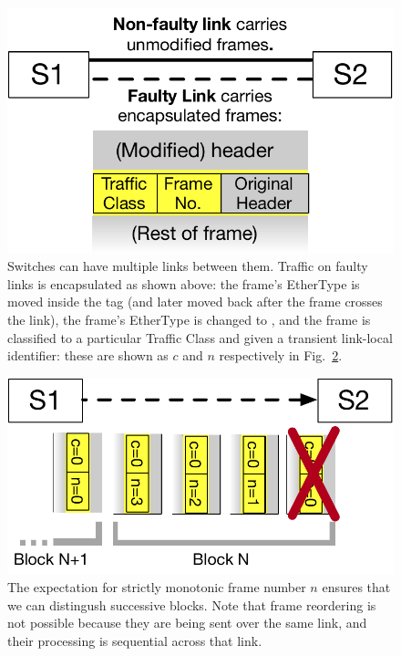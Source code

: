 \begin{figure}
  \centering
  \includegraphics[width=0.3\paperwidth]{header_format.pdf}
  \caption{\label{fig:format}Switches can have multiple links between them.
  Traffic on faulty links is encapsulated as shown above: the frame's EtherType
  is moved inside the \OurSys tag (and later moved back after the frame crosses
  the link), the frame's EtherType is changed to \OurSys, and the frame is
  classified to a particular Traffic Class and given a transient link-local
  identifier: these are shown as $c$ and $n$ respectively in
  Fig.~\ref{fig:example-loss}.}
\end{figure}

\begin{figure}
  \centering
  \includegraphics[width=0.4\paperwidth]{loss_example.pdf}
  \caption{\label{fig:example-loss}The expectation for strictly monotonic frame
  number $n$ ensures that we can distingush successive blocks. Note that frame
  reordering is not possible because they are being sent over the same link,
  and their processing is sequential across that link.}
\end{figure}

